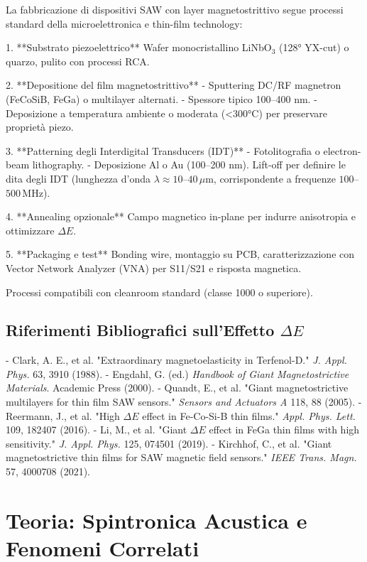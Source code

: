 \documentclass[11pt,a4paper]{article}
\begin{document}
La fabbricazione di dispositivi SAW con layer magnetostrittivo segue processi standard della microelettronica e thin-film technology:

1. **Substrato piezoelettrico**  
   Wafer monocristallino LiNbO$_3$ (128° YX-cut) o quarzo, pulito con processi RCA.

2. **Depositione del film magnetostrittivo**  
   - Sputtering DC/RF magnetron (FeCoSiB, FeGa) o multilayer alternati.
   - Spessore tipico 100–400 nm.
   - Deposizione a temperatura ambiente o moderata (<300°C) per preservare proprietà piezo.

3. **Patterning degli Interdigital Transducers (IDT)**  
   - Fotolitografia o electron-beam lithography.
   - Deposizione Al o Au (100–200 nm).
     Lift-off per definire le dita degli IDT (lunghezza d'onda $\lambda \approx 10$--$40\,\mu$m, corrispondente a frequenze $100$--$500$\,MHz).

4. **Annealing opzionale**  
   Campo magnetico in-plane per indurre anisotropia e ottimizzare $\Delta E$.

5. **Packaging e test**  
   Bonding wire, montaggio su PCB, caratterizzazione con Vector Network Analyzer (VNA) per S11/S21 e risposta magnetica.

Processi compatibili con cleanroom standard (classe 1000 o superiore).

\subsection{Riferimenti Bibliografici sull'Effetto $\Delta E$}

- Clark, A. E., et al. "Extraordinary magnetoelasticity in Terfenol-D." \textit{J. Appl. Phys.} 63, 3910 (1988).
- Engdahl, G. (ed.) \textit{Handbook of Giant Magnetostrictive Materials}. Academic Press (2000).
- Quandt, E., et al. "Giant magnetostrictive multilayers for thin film SAW sensors." \textit{Sensors and Actuators A} 118, 88 (2005).
- Reermann, J., et al. "High $\Delta E$ effect in Fe-Co-Si-B thin films." \textit{Appl. Phys. Lett.} 109, 182407 (2016).
- Li, M., et al. "Giant $\Delta E$ effect in FeGa thin films with high sensitivity." \textit{J. Appl. Phys.} 125, 074501 (2019).
- Kirchhof, C., et al. "Giant magnetostrictive thin films for SAW magnetic field sensors." \textit{IEEE Trans. Magn.} 57, 4000708 (2021).

\section{Teoria: Spintronica Acustica e Fenomeni Correlati}
\end{document}
